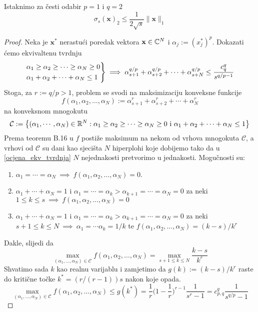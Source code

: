\documentclass[a4paper,twoside,12pt]{memoir} %
\newcommand{\vect}[1]{\mathbf{#1}}
\renewcommand{\vec}{\vect}
\begin{document}
Istaknimo za \v{c}esti odabir $p=1$ i $q=2$
\begin{equation*}
    \sigma_s(\vec{x})_2 \leq \frac{1}{2\sqrt{s}}\|\vec{x}\|_1
\end{equation*}
\begin{proof}
    Neka je $\vec{x}^*$ nerastu\'ci poredak vektora $\vec{x}\in\C^N$ i $\alpha_j := (x_j^*)^p$. Dokazati \'cemo ekvivaltenu tvrdnju
    \begin{equation}\label{ocjena_ekv_tvrdnja}
    \begin{rcases}
{\alpha_1 \geq \alpha_2 \geq \cdots \geq \alpha_N \geq 0} \\
{\alpha_1 + \alpha_2 + \cdots + \alpha_N \leq 1} 
\end{rcases}\implies \alpha_{s+1}^{q/p} + \alpha_{s+2}^{q/p} + \cdots + \alpha_{s+N}^{q/p} \leq \frac{c^q_{q}}{s^{q/p-1}}
    \end{equation}
    Stoga, za $r:=q/p>1$, problem se svodi na maksimizaciju konveksne funkcije
    $$
    f(\alpha_1, \alpha_2, \dots, \alpha_N) := \alpha_{s+1}^r + \alpha_{s+2}^r + \cdots +\alpha_{N}^r
    $$
    na konveksnom mnogokutu
    $$
    \mathcal{C} := \big\{ (\alpha_1, \cdots, \alpha_N)\in \mathbb{R}^N :  \alpha_1 \geq \alpha_2 \geq \cdots \geq \alpha_N \geq 0 \text{ i }  \alpha_1 + \alpha_2 + \cdots + \alpha_N \leq 1\big\}
    $$
    Prema teoremu B.16 u \cite{foucart13} $f$ posti\v{z}e maksimum na nekom od vrhova mnogokuta $\mathcal{C}$, a vrhovi od $\mathcal{C}$ su dani kao sjeci\v{s}ta  $N$ hiperplohi koje dobijemo tako da u \eqref{ocjena_ekv_tvrdnja} $N$ nejednakosti pretvorimo u jednakosti. Mogu\v{c}nosti su:
    \begin{enumerate}
        \item $\alpha_1=\cdots=\alpha_N \ \implies\  f(\alpha_1, \alpha_2, \dots, \alpha_N) = 0$.
        \item $\alpha_1+\cdots+\alpha_N=1$ i $\alpha_1=\cdots=\alpha_k>\alpha_{k+1}=\cdots=\alpha_N=0$ za neki \\ $1\leq k \leq s \  \implies \  f(\alpha_1, \alpha_2, \dots, \alpha_N) = 0$
        \item $\alpha_1+\cdots+\alpha_N=1$ i $\alpha_1=\cdots=\alpha_k>\alpha_{k+1}=\cdots=\alpha_N=0$ za neki\\ $s+1\leq k \leq N \  \implies \  \alpha_1=\cdots\alpha_k=1/k$ te $f(\alpha_1, \alpha_2, \dots, \alpha_N) = (k-s)/k^r$
    \end{enumerate}
    Dakle, slijedi da 
    $$
    \max\limits_{(\alpha_1,\dots,\alpha_N)\in\mathcal{C}} f(\alpha_1, \alpha_2, \dots, \alpha_N) = \max\limits_{s+1\leq k \leq N} \frac{k-s}{k^r}
    $$
    Shvatimo sada $k$ kao realnu varijablu i zamjetimo da $g(k):=(k-s)/k^r$ raste do kriti\v{c}ne to\v{c}ke $k^*=(r/(r-1))s$ nakon koje opada.
    $$
    \max\limits_{(\alpha_1,\dots,\alpha_N)\in\mathcal{C}} f(\alpha_1, \alpha_2, \dots, \alpha_N) \leq g(k^*) = \frac{1}{r}\bigg( 1- \frac{1}{r}\bigg)^{r-1}\frac{1}{s^r-1}=c^q_{p,q}\frac{1}{s^{q/p}-1}
    $$
\end{proof}
\end{document}
